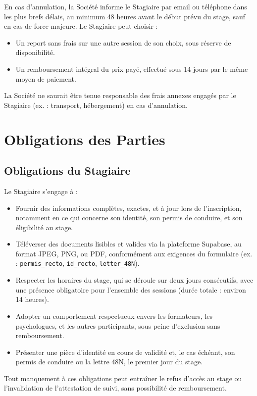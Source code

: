 \documentclass[a4paper,12pt]{article}
\begin{document}
En cas d'annulation, la Société informe le Stagiaire par email ou téléphone dans les plus brefs délais, au minimum 48 heures avant le début prévu du stage, sauf en cas de force majeure. Le Stagiaire peut choisir :
\begin{itemize}
    \item Un report sans frais sur une autre session de son choix, sous réserve de disponibilité.
    \item Un remboursement intégral du prix payé, effectué sous 14 jours par le même moyen de paiement.
\end{itemize}

La Société ne saurait être tenue responsable des frais annexes engagés par le Stagiaire (ex. : transport, hébergement) en cas d'annulation.

\section{Obligations des Parties}
\subsection{Obligations du Stagiaire}
Le Stagiaire s'engage à :
\begin{itemize}
    \item Fournir des informations complètes, exactes, et à jour lors de l'inscription, notamment en ce qui concerne son identité, son permis de conduire, et son éligibilité au stage.
    \item Téléverser des documents lisibles et valides via la plateforme Supabase, au format JPEG, PNG, ou PDF, conformément aux exigences du formulaire (ex. : \texttt{permis\_recto}, \texttt{id\_recto}, \texttt{letter\_48N}).
    \item Respecter les horaires du stage, qui se déroule sur deux jours consécutifs, avec une présence obligatoire pour l'ensemble des sessions (durée totale : environ 14 heures).
    \item Adopter un comportement respectueux envers les formateurs, les psychologues, et les autres participants, sous peine d'exclusion sans remboursement.
    \item Présenter une pièce d'identité en cours de validité et, le cas échéant, son permis de conduire ou la lettre 48N, le premier jour du stage.
\end{itemize}

Tout manquement à ces obligations peut entraîner le refus d'accès au stage ou l'invalidation de l'attestation de suivi, sans possibilité de remboursement.
\end{document}
